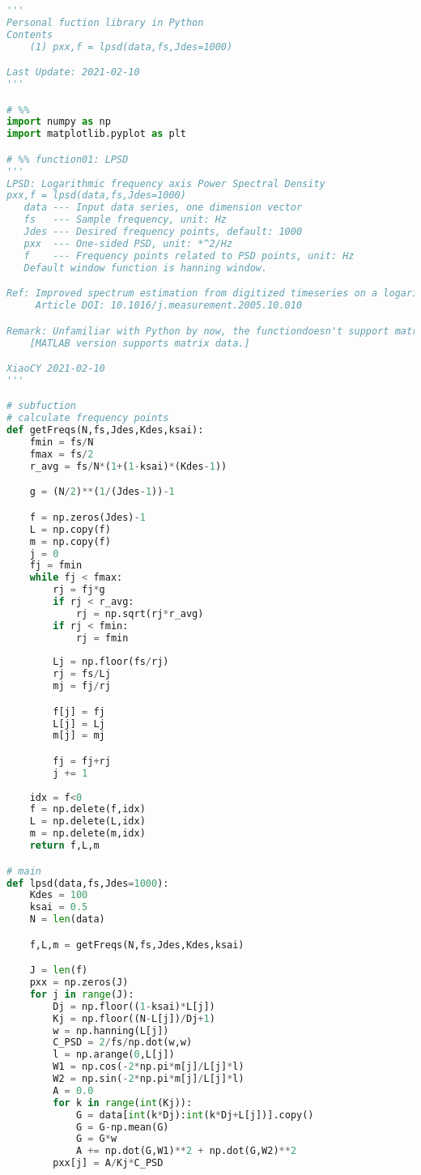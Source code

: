 \begin{lstlisting}[language=Python]
'''
Personal fuction library in Python
Contents
    (1) pxx,f = lpsd(data,fs,Jdes=1000)

Last Update: 2021-02-10
'''

# %%
import numpy as np
import matplotlib.pyplot as plt

# %% function01: LPSD
'''
LPSD: Logarithmic frequency axis Power Spectral Density
pxx,f = lpsd(data,fs,Jdes=1000)
   data --- Input data series, one dimension vector
   fs   --- Sample frequency, unit: Hz
   Jdes --- Desired frequency points, default: 1000
   pxx  --- One-sided PSD, unit: *^2/Hz
   f    --- Frequency points related to PSD points, unit: Hz
   Default window function is hanning window.

Ref: Improved spectrum estimation from digitized timeseries on a logarithmic frequency axis
     Article DOI: 10.1016/j.measurement.2005.10.010

Remark: Unfamiliar with Python by now, the functiondoesn't support matrix data by now.
    [MATLAB version supports matrix data.]

XiaoCY 2021-02-10
'''

# subfuction
# calculate frequency points
def getFreqs(N,fs,Jdes,Kdes,ksai):
    fmin = fs/N
    fmax = fs/2
    r_avg = fs/N*(1+(1-ksai)*(Kdes-1))

    g = (N/2)**(1/(Jdes-1))-1

    f = np.zeros(Jdes)-1
    L = np.copy(f)
    m = np.copy(f)
    j = 0
    fj = fmin
    while fj < fmax:
        rj = fj*g
        if rj < r_avg:
            rj = np.sqrt(rj*r_avg)
        if rj < fmin:
            rj = fmin
        
        Lj = np.floor(fs/rj)
        rj = fs/Lj
        mj = fj/rj

        f[j] = fj
        L[j] = Lj
        m[j] = mj

        fj = fj+rj
        j += 1
    
    idx = f<0
    f = np.delete(f,idx)
    L = np.delete(L,idx)
    m = np.delete(m,idx)
    return f,L,m

# main
def lpsd(data,fs,Jdes=1000):
    Kdes = 100
    ksai = 0.5
    N = len(data)

    f,L,m = getFreqs(N,fs,Jdes,Kdes,ksai)

    J = len(f)
    pxx = np.zeros(J)
    for j in range(J):
        Dj = np.floor((1-ksai)*L[j])
        Kj = np.floor((N-L[j])/Dj+1)
        w = np.hanning(L[j])
        C_PSD = 2/fs/np.dot(w,w)
        l = np.arange(0,L[j])
        W1 = np.cos(-2*np.pi*m[j]/L[j]*l)
        W2 = np.sin(-2*np.pi*m[j]/L[j]*l)
        A = 0.0
        for k in range(int(Kj)):
            G = data[int(k*Dj):int(k*Dj+L[j])].copy()
            G = G-np.mean(G)
            G = G*w
            A += np.dot(G,W1)**2 + np.dot(G,W2)**2
        pxx[j] = A/Kj*C_PSD


\end{lstlisting}
